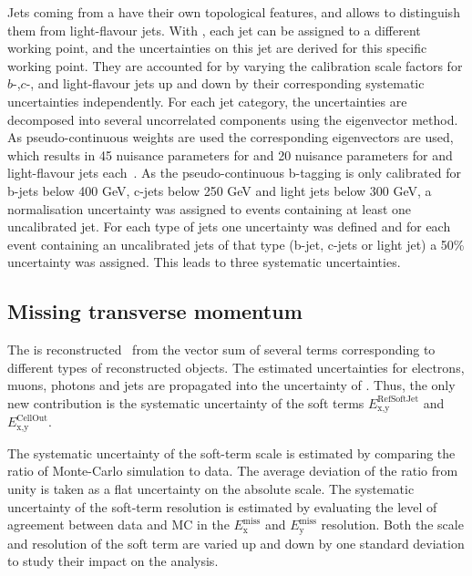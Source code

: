 Jets coming from a \bquarks have their own topological features, and \btag allows to distinguish them from light-flavour jets. With \emph{\btag}, each jet can be assigned to a different working point, and the \btag uncertainties on this jet are derived for this specific working point. They are accounted for by varying the calibration scale factors for \ensuremath{b}-,\ensuremath{c}-, and light-flavour jets up and down by their corresponding systematic uncertainties independently. For each jet category, the uncertainties are decomposed into several uncorrelated components using the eigenvector method. As pseudo-continuous \btag weights are used the corresponding eigenvectors are used, which results in 45 nuisance parameters for \bjets and 20 nuisance parameters for \cjets and light-flavour jets each~\cite{ATL-PHYS-PUB-2017-013}.
As the pseudo-continuous b-tagging is only calibrated for b-jets below 400 GeV, c-jets below 250 GeV and light jets below 300 GeV, a normalisation uncertainty was assigned to events containing at least one uncalibrated jet. For each type of jets one uncertainty was defined and for each event containing an uncalibrated jets of that type (b-jet, c-jets or light jet) a 50\% uncertainty was assigned. This leads to three systematic uncertainties.

\subsection*{Missing transverse momentum}

The \met is reconstructed~\cite{ATLAS-CONF-2018-023} from the vector sum of several terms corresponding to different types of reconstructed objects. The estimated uncertainties for electrons, muons, photons and jets are propagated into the uncertainty of \met. Thus, the only new contribution is the systematic uncertainty of the soft terms $E_{\text{x,y}}^{\text{RefSoftJet}}$ and $E_{\text{x,y}}^{\text{CellOut}}$.

The systematic uncertainty of the soft-term scale is estimated by comparing the ratio of Monte-Carlo simulation to data. The average deviation of the ratio from unity is taken as a flat uncertainty on the absolute scale. The systematic uncertainty of the soft-term resolution is estimated by evaluating the level of agreement between data and MC in the $E^{\text{miss}}_{\text{x}}$ and $E^{\text{miss}}_{\text{y}}$ resolution. Both the scale and resolution of the soft term are varied up and down by one standard deviation to study their impact on the analysis. 

